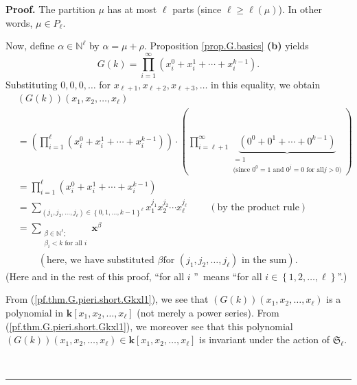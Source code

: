 \documentclass[numbers=enddot,12pt,final,onecolumn,notitlepage]{scrartcl}%
\theoremstyle{definition}
\newenvironment{proof}[1][Proof]{\noindent\textbf{#1.} }{\ \rule{0.5em}{0.5em}}
\let\sumnonlimits\sum
\let\prodnonlimits\prod
\renewcommand{\sum}{\sumnonlimits\limits}
\renewcommand{\prod}{\prodnonlimits\limits}
\newenvironment{vershort}{}{}
\begin{document}
\begin{vershort}
\begin{proof}
The partition $\mu$ has at most $\ell$ parts (since $\ell\geq\ell\left(
\mu\right)  $). In other words, $\mu\in P_{\ell}$.

Now, define $\alpha\in\mathbb{N}^{\ell}$ by $\alpha=\mu+\rho$. Proposition
\ref{prop.G.basics} \textbf{(b)} yields%
\[
G\left(  k\right)  =\prod_{i=1}^{\infty}\left(  x_{i}^{0}+x_{i}^{1}%
+\cdots+x_{i}^{k-1}\right)  .
\]
Substituting $0,0,0,\ldots$ for $x_{\ell+1},x_{\ell+2},x_{\ell+3},\ldots$ in
this equality, we obtain%
\begin{align}
&  \left(  G\left(  k\right)  \right)  \left(  x_{1},x_{2},\ldots,x_{\ell
}\right) \nonumber\\
&  =\left(  \prod_{i=1}^{\ell}\left(  x_{i}^{0}+x_{i}^{1}+\cdots+x_{i}%
^{k-1}\right)  \right)  \cdot\left(  \prod_{i=\ell+1}^{\infty}%
\underbrace{\left(  0^{0}+0^{1}+\cdots+0^{k-1}\right)  }%
_{\substack{=1\\\text{(since }0^{0}=1\text{ and }0^{j}=0\text{ for all
}j>0\text{)}}}\right) \nonumber\\
&  =\prod_{i=1}^{\ell}\left(  x_{i}^{0}+x_{i}^{1}+\cdots+x_{i}^{k-1}\right)
\label{pf.thm.G.pieri.short.Gkxl1}\\
&  =\sum_{\left(  j_{1},j_{2},\ldots,j_{\ell}\right)  \in\left\{
0,1,\ldots,k-1\right\}  ^{\ell}}x_{1}^{j_{1}}x_{2}^{j_{2}}\cdots x_{\ell
}^{j_{\ell}}\ \ \ \ \ \ \ \ \ \ \left(  \text{by the product rule}\right)
\nonumber\\
&  =\sum_{\substack{\beta\in\mathbb{N}^{\ell};\\\beta_{i}<k\text{ for all }%
i}}\mathbf{x}^{\beta}\label{pf.thm.G.pieri.short.Gkxl2}\\
&  \ \ \ \ \ \ \ \ \ \ \left(  \text{here, we have substituted }\beta\text{
for }\left(  j_{1},j_{2},\ldots,j_{\ell}\right)  \text{ in the sum}\right)
.\nonumber
\end{align}
(Here and in the rest of this proof, \textquotedblleft for all $i$%
\textquotedblright\ means \textquotedblleft for all $i\in\left\{
1,2,\ldots,\ell\right\}  $\textquotedblright.)

From (\ref{pf.thm.G.pieri.short.Gkxl1}), we see that $\left(  G\left(
k\right)  \right)  \left(  x_{1},x_{2},\ldots,x_{\ell}\right)  $ is a
polynomial in $\mathbf{k}\left[  x_{1},x_{2},\ldots,x_{\ell}\right]  $ (not
merely a power series). From (\ref{pf.thm.G.pieri.short.Gkxl1}), we moreover
see that this polynomial $\left(  G\left(  k\right)  \right)  \left(
x_{1},x_{2},\ldots,x_{\ell}\right)  \in\mathbf{k}\left[  x_{1},x_{2}%
,\ldots,x_{\ell}\right]  $ is invariant under the action of $\mathfrak{S}%
_{\ell}$.


\end{proof}
\end{vershort}
\end{document}
